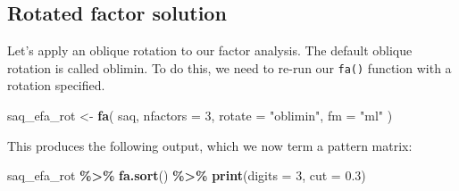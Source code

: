 \documentclass[
]{book}
\newenvironment{Shaded}{\begin{snugshade}}{\end{snugshade}}
\newcommand{\AttributeTok}[1]{\textcolor[rgb]{0.13,0.29,0.53}{#1}}
\newcommand{\DecValTok}[1]{\textcolor[rgb]{0.00,0.00,0.81}{#1}}
\newcommand{\FloatTok}[1]{\textcolor[rgb]{0.00,0.00,0.81}{#1}}
\newcommand{\FunctionTok}[1]{\textcolor[rgb]{0.13,0.29,0.53}{\textbf{#1}}}
\newcommand{\NormalTok}[1]{#1}
\newcommand{\OtherTok}[1]{\textcolor[rgb]{0.56,0.35,0.01}{#1}}
\newcommand{\SpecialCharTok}[1]{\textcolor[rgb]{0.81,0.36,0.00}{\textbf{#1}}}
\newcommand{\StringTok}[1]{\textcolor[rgb]{0.31,0.60,0.02}{#1}}
\begin{document}
\hypertarget{rotated-factor-solution}{%
\subsection{Rotated factor solution}\label{rotated-factor-solution}}

Let's apply an oblique rotation to our factor analysis. The default oblique rotation is called oblimin. To do this, we need to re-run our \texttt{fa()} function with a rotation specified.

\begin{Shaded}
\begin{Highlighting}[]
\NormalTok{saq\_efa\_rot }\OtherTok{\textless{}{-}} \FunctionTok{fa}\NormalTok{(}
\NormalTok{  saq,}
  \AttributeTok{nfactors =} \DecValTok{3}\NormalTok{,}
  \AttributeTok{rotate =} \StringTok{"oblimin"}\NormalTok{,}
  \AttributeTok{fm =} \StringTok{"ml"}
\NormalTok{)}
\end{Highlighting}
\end{Shaded}

This produces the following output, which we now term a pattern matrix:

\begin{Shaded}
\begin{Highlighting}[]
\NormalTok{saq\_efa\_rot }\SpecialCharTok{\%\textgreater{}\%}
  \FunctionTok{fa.sort}\NormalTok{() }\SpecialCharTok{\%\textgreater{}\%}
  \FunctionTok{print}\NormalTok{(}\AttributeTok{digits =} \DecValTok{3}\NormalTok{, }\AttributeTok{cut =} \FloatTok{0.3}\NormalTok{)}
\end{Highlighting}
\end{Shaded}
\end{document}

